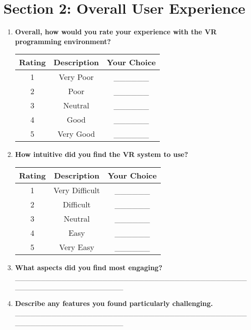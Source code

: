 \documentclass[12pt]{article}
\begin{document}
\section*{Section 2: Overall User Experience}
\begin{enumerate}
    \item \textbf{Overall, how would you rate your experience with the VR programming environment?}
    \begin{table}[h!]
        \centering
        \begin{tabular}{|c|c|c|}
            \hline
            \textbf{Rating} & \textbf{Description} & \textbf{Your Choice} \\
            \hline
            1 & Very Poor & \_\_\_\_\_\_ \\
            \hline
            2 & Poor & \_\_\_\_\_\_ \\
            \hline
            3 & Neutral & \_\_\_\_\_\_ \\
            \hline
            4 & Good & \_\_\_\_\_\_ \\
            \hline
            5 & Very Good & \_\_\_\_\_\_ \\
            \hline
        \end{tabular}
    \end{table}
  \clearpage

    \item \textbf{How intuitive did you find the VR system to use?}
    \begin{table}[h!]
        \centering
        \begin{tabular}{|c|c|c|}
            \hline
            \textbf{Rating} & \textbf{Description} & \textbf{Your Choice} \\
            \hline
            1 & Very Difficult & \_\_\_\_\_\_ \\
            \hline
            2 & Difficult & \_\_\_\_\_\_ \\
            \hline
            3 & Neutral & \_\_\_\_\_\_ \\
            \hline
            4 & Easy & \_\_\_\_\_\_ \\
            \hline
            5 & Very Easy & \_\_\_\_\_\_ \\
            \hline
        \end{tabular}
    \end{table}
    \space
    \space
    \space
    \space

    \item \textbf{What aspects did you find most engaging?} \\
    \_\_\_\_\_\_\_\_\_\_\_\_\_\_\_\_\_\_\_\_\_\_\_\_\_\_\_\_\_\_\_\_\_\_\_\_\_\_\_\_\_\_\_\_\_\_\_\_\_\_\_\_\_\_\_\_\_\_\_\_\_\_\_\_\_\_
    \item \textbf{Describe any features you found particularly challenging.} \\
    \_\_\_\_\_\_\_\_\_\_\_\_\_\_\_\_\_\_\_\_\_\_\_\_\_\_\_\_\_\_\_\_\_\_\_\_\_\_\_\_\_\_\_\_\_\_\_\_\_\_\_\_\_\_\_\_\_\_\_\_\_\_\_\_\_\_
\end{enumerate}
\end{document}
